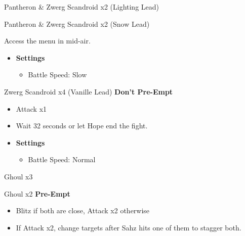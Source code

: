\documentclass{report}
\begin{document}

\begin{battle}{Pantheron \& Zwerg Scandroid x2 (Lighting Lead)}
\end{battle}


\begin{battle}{Pantheron \& Zwerg Scandroid x2 (Snow Lead)}
\end{battle}

Access the menu in mid-air.

\begin{menu}
\begin{itemize}
    \item \textbf{Settings}
    \begin{itemize}
        \item Battle Speed: Slow
    \end{itemize}
\end{itemize}
\end{menu}

\begin{battle}{Zwerg Scandroid x4 (Vanille Lead) \textbf{Don't Pre-Empt}}
\begin{itemize}
    \item Attack x1
    \item Wait 32 seconds or let Hope end the fight.
\end{itemize}
\end{battle}


\begin{menu}
\begin{itemize}
    \item \textbf{Settings}
    \begin{itemize}
        \item Battle Speed: Normal
    \end{itemize}
\end{itemize}
\end{menu}

\begin{battle}{Ghoul x3}
\end{battle}

\begin{battle}{Ghoul x2 \textbf{Pre-Empt}}
\begin{itemize}
    \item Blitz if both are close, Attack x2 otherwise
    \item If Attack x2, change targets after Sahz hits one of them to stagger both.
\end{itemize}
\end{battle}
\end{document}

